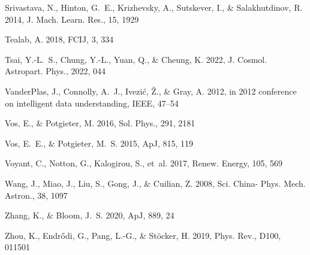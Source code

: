 \documentclass[twocolumn,,12pt]{aastex631}
\begin{document}
\begin{thebibliography}{99}
Srivastava, N., Hinton, G.~E., Krizhevsky, A., Sutskever, I., \& Salakhutdinov,
  R. 2014, J. Mach. Learn. Res., 15, 1929

Tealab, A. 2018, FCIJ, 3, 334

Tsai, Y.-L.~S., Chung, Y.-L., Yuan, Q., \& Cheung, K. 2022, J. Cosmol.
  Astropart. Phys., 2022, 044

VanderPlas, J., Connolly, A.~J., Ivezi{\'c}, {\v{Z}}., \& Gray, A. 2012, in
  2012 conference on intelligent data understanding, IEEE, 47--54

Vos, E., \& Potgieter, M. 2016, Sol. Phys., 291, 2181

Vos, E.~E., \& Potgieter, M.~S. 2015, ApJ, 815, 119

Voyant, C., Notton, G., Kalogirou, S., {et~al.} 2017, Renew. Energy, 105, 569

Wang, J., Miao, J., Liu, S., Gong, J., \& Cuilian, Z. 2008, Sci. China- Phys.
  Mech. Astron., 38, 1097

Zhang, K., \& Bloom, J.~S. 2020, ApJ, 889, 24

Zhou, K., Endr{\H o}di, G., Pang, L.-G., \& St{\"o}cker, H. 2019, Phys. Rev.,
  D100, 011501

\end{thebibliography}
\end{document}
